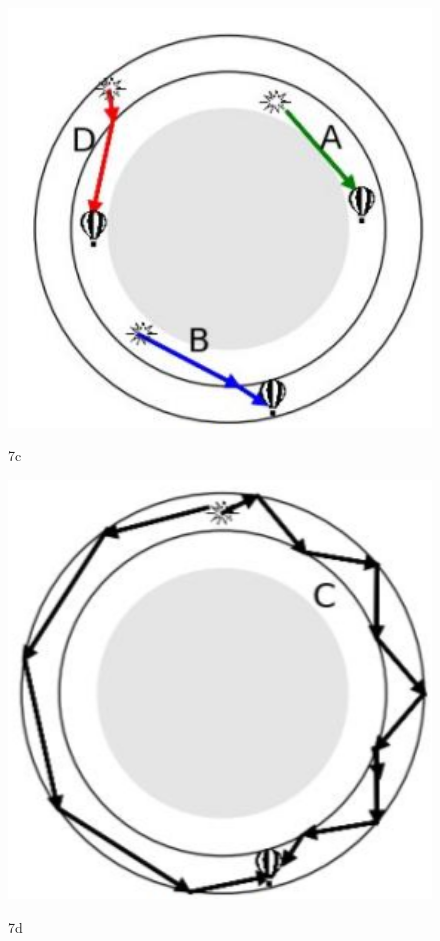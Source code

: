\begin{figure}[h]
  \centering
  \begin{minipage}{6cm}
    \centering
    \includegraphics[width=1.1\textwidth]{images/Hinh 7c (S) .png}
    \begin{center}
      \figurename{ 7c}
    \end{center}
  \end{minipage}
  \hfil
  \begin{minipage}{6cm}
    \centering
    \includegraphics[width=1\textwidth]{images/Hinh 7d (S).png}
    \vspace{1mm}
    \begin{center}
      \figurename{ 7d}
    \end{center}
  \end{minipage}
\end{figure}






